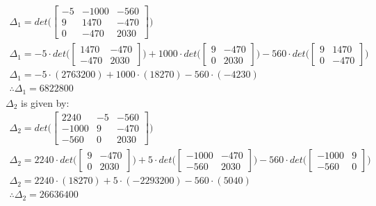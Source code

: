 \documentclass[letterpaper]{article}
\begin{document}
    \begin{gather*}
        \Delta_1 = det\Bigg(
        \begin{bmatrix}
            -5 & -1000 & -560\\
            9 & 1470 & -470\\
            0 & -470 & 2030
        \end{bmatrix}
        \Bigg)\\
        \Delta_1 = -5\cdot det\bigg(
        \begin{bmatrix}
            1470 & -470\\
            -470 & 2030
        \end{bmatrix}
        \bigg)
        +1000\cdot det\bigg(
        \begin{bmatrix}
            9 & -470\\
            0 & 2030
        \end{bmatrix}
        \bigg)
        -560\cdot det\bigg(
        \begin{bmatrix}
            9 & 1470\\
            0 & -470
        \end{bmatrix}
        \bigg)\\
        \Delta_1 = -5\cdot(2763200)+1000\cdot(18270)-560\cdot(-4230)\\
        \therefore\Delta_1 = 6822800
    \end{gather*}
$\Delta_2$ is given by:
    \begin{gather*}
        \Delta_2 = det\Bigg(
        \begin{bmatrix}
            2240 & -5 & -560\\
            -1000 & 9 & -470\\
            -560 & 0 & 2030
        \end{bmatrix}
        \Bigg)\\
        \Delta_2 = 2240\cdot det\bigg(
        \begin{bmatrix}
            9 & -470\\
            0 & 2030
        \end{bmatrix}
        \bigg)
        +5\cdot det\bigg(
        \begin{bmatrix}
            -1000 & -470\\
            -560 & 2030
        \end{bmatrix}
        \bigg)
        -560\cdot det\bigg(
        \begin{bmatrix}
            -1000 & 9\\
            -560 & 0
        \end{bmatrix}
        \bigg)\\
        \Delta_2 = 2240\cdot(18270)+5\cdot(-2293200)-560\cdot(5040)\\
        \therefore\Delta_2 = 26636400
    \end{gather*}
\end{document}
